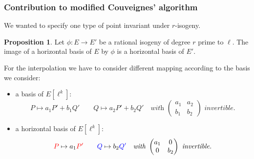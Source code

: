 \documentclass[10pt,a4paper]{beamer}
\theoremstyle{plain}
\theoremstyle{definition}
\theoremstyle{definition}
\theoremstyle{definition}
\newtheorem{prop}[thm]{Proposition}
\theoremstyle{definition}
\theoremstyle{remark}
\newtheorem{rem}[thm]{Remark}
\theoremstyle{remark}
\begin{document}
\begin{frame}
\frametitle{Contribution to modified Couveignes' algorithm}
We wanted to specify one type of point invariant under $r$-isogeny. %
\begin{prop}
Let $\phi:E\rightarrow E'$ be a rational isogeny of degree $r$ prime to $\ell$. The image of a horizontal basis of $E$ by $\phi$ is a horizontal basis of $E'$.
\end{prop}



For the interpolation we have to consider different mapping according to the basis we consider:
\begin{itemize}
\item a basis of $E[\ell^k]$:
\[
P \mapsto a_1 P' + b_1 Q' \quad \quad Q \mapsto a_2 P' + b_2 Q' \quad \textit{with } \left( \begin{matrix}
a_1 & a_2 \\
b_1 & b_2
\end{matrix}  \right) \textit{ invertible.}
\]

\item a horizontal basis of $E[\ell^k]$:
\[
\color{red}P\color{black} \mapsto a_1 \color{red}P'\color{blue} \quad \quad Q\color{black} \mapsto b_2 \color{blue}Q'\color{black} \quad \textit{with } \left( \begin{matrix}
a_1 & 0 \\
0 & b_2
\end{matrix}  \right) \textit{ invertible.}
\]
\end{itemize}
\end{frame}

%
%
%
%
%
%
%
\end{document}
